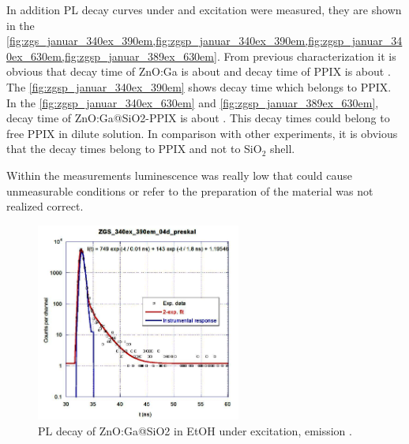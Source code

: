     
    In addition PL decay curves under  and  excitation were measured, they are shown in the \cref{fig:zgs_januar_340ex_390em,fig:zgsp_januar_340ex_390em,fig:zgsp_januar_340ex_630em,fig:zgsp_januar_389ex_630em}. 
    From previous characterization it is obvious that decay time of ZnO:Ga is about  and decay time of PPIX is about . 
    The \cref{fig:zgsp_januar_340ex_390em} shows decay time  which belongs to PPIX. 
    In the \cref{fig:zgsp_januar_340ex_630em} and \cref{fig:zgsp_januar_389ex_630em}, decay time of ZnO:Ga@SiO2-PPIX is about . 
    This decay times could belong to free PPIX in dilute solution. 
    In comparison with other experiments, it is obvious that the decay times belong to PPIX and not to SiO$_{2}$ shell.
    
    Within the measurements luminescence was really low that could cause unmeasurable conditions or refer to the preparation of the material was not realized correct.\\
    
    \begin{figure}
        \centering
        \includegraphics[width=0.6\textwidth]{pictures/zgs_januar_340ex_390em.PNG}
        \caption{PL decay of ZnO:Ga@SiO2 in EtOH under  excitation, emission .}
        \label{fig:zgs_januar_340ex_390em}
    \end{figure}
    
